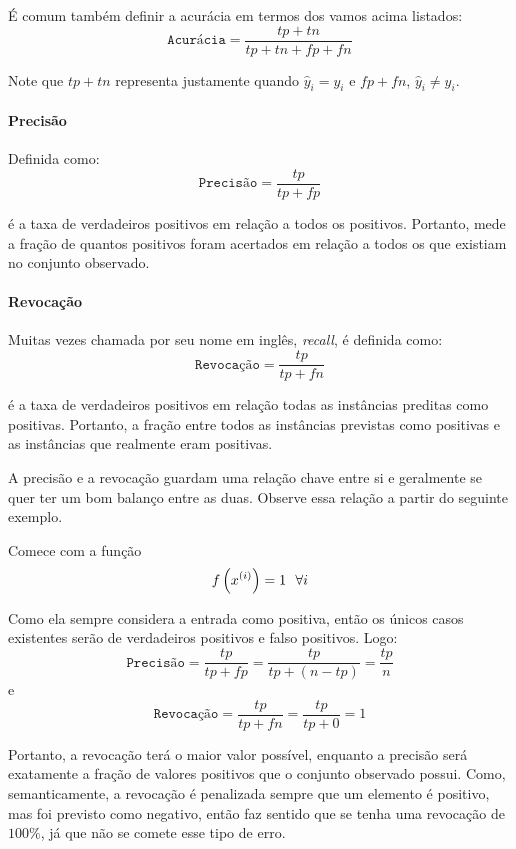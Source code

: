 É comum também definir a acurácia em termos dos vamos acima listados:
\[
\texttt{Acurácia} = \dfrac{tp+tn}{tp+tn+fp+fn}
\]

Note que $tp+tn$ representa justamente quando $\hat{y}_i=y_i$ e $fp+fn$,
$\hat{y}_i\neq y_i$.

\paragraph{Precisão}%
\label{par:precisao}

Definida como:
\[
\texttt{Precisão} = \dfrac{tp}{tp+fp}
\]

é a taxa de verdadeiros positivos em relação a todos os positivos. Portanto,
mede a fração de quantos positivos foram acertados em relação a todos os que
existiam no conjunto observado.

\paragraph{Revocação}%
\label{par:revocacao}

Muitas vezes chamada por seu nome em inglês, \textit{recall}, é definida como:
\[
\texttt{Revocação} = \dfrac{tp}{tp+fn}
\]

é a taxa de verdadeiros positivos em relação todas as instâncias preditas como
positivas. Portanto, a fração entre todos as instâncias previstas como positivas
e as instâncias que realmente eram positivas.

A precisão e a revocação guardam uma relação chave entre si e geralmente se quer
ter um bom balanço entre as duas. Observe essa relação a partir do seguinte
exemplo.

Comece com a função
\begin{equation}
  f\paren{\xii[x]{i}} = 1~~\forall i
\end{equation}

Como ela sempre considera a entrada como positiva, então os únicos casos
existentes serão de verdadeiros positivos e falso positivos. Logo:
\[
\texttt{Precisão} = \dfrac{tp}{tp+fp} = \dfrac{tp}{tp+(n-tp)} = \dfrac{tp}{n}
\]
e
\[
\texttt{Revocação} = \dfrac{tp}{tp+fn} = \dfrac{tp}{tp+0} = 1
\]

Portanto, a revocação terá o maior valor possível, enquanto a precisão será
exatamente a fração de valores positivos que o conjunto observado possui. Como,
semanticamente, a revocação é penalizada sempre que um elemento é positivo, mas
foi previsto como negativo, então faz sentido que se tenha uma revocação de
$100\%$, já que não se comete esse tipo de erro.

